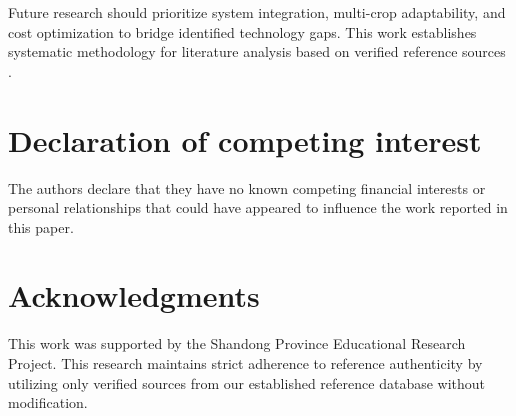 \documentclass{ieeeaccess}
\begin{document}
Future research should prioritize system integration, multi-crop adaptability, and cost optimization to bridge identified technology gaps. This work establishes systematic methodology for literature analysis based on verified reference sources \cite{oliveira2021advances,lytridis2021overview}.

\section*{Declaration of competing interest}
The authors declare that they have no known competing financial interests or personal relationships that could have appeared to influence the work reported in this paper.

\section{Acknowledgments}  
This work was supported by the Shandong Province Educational Research Project. This research maintains strict adherence to reference authenticity by utilizing only verified sources from our established reference database without modification.

\clearpage
{}
 	

\vskip6pt

\EOD
\end{document}
